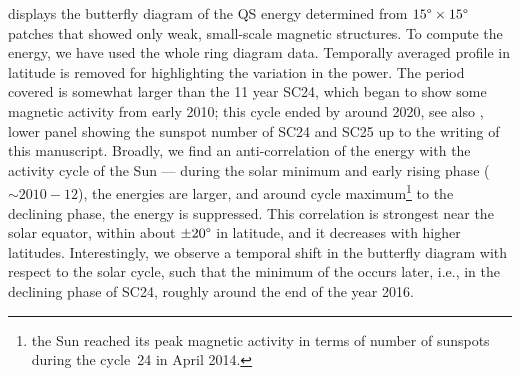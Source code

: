 \documentclass{aa}
\begin{document}




 displays the butterfly diagram of the QS
\fff energy determined
from $15\degree \times 15\degree$ patches that showed only weak, small-scale magnetic structures.
To compute the \fff
energy, we have used the whole ring diagram data.
Temporally averaged profile in latitude is removed for highlighting the variation in the
\fff power. The period covered is somewhat larger than the 11 year %
SC24,
which
began to show some magnetic activity from early 2010; this cycle ended by around 2020, see also , lower panel showing the sunspot number of SC24 and SC25 up to the writing of this manuscript.
Broadly, we find an anti-correlation of the \fff 
energy with the activity cycle of the
Sun --- during the solar minimum and early rising phase ($\sim 2010-12$), the \fff
energies
are larger, and around cycle maximum\footnote{the Sun reached its peak magnetic activity
in terms of number of sunspots during the cycle~24 in April 2014.} to the declining phase,
the \fff
energy 
is suppressed.
This correlation is strongest near the solar equator, within about $\pm 20\degree$ in
latitude, and it decreases with higher latitudes.
Interestingly, we observe a temporal shift in the \fff butterfly diagram with respect to the
solar cycle, such that the minimum of the \fff occurs later, i.e., in the declining phase of
SC24, roughly around the end of the year 2016.
\end{document}
